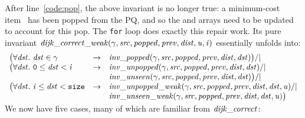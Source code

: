 After line~\ref{code:pop},
the above invariant is no longer true: a minimum-cost item~ has been
popped from the PQ, and so the  and  arrays need to be
updated to account for this pop. The \texttt{for} loop does exactly this repair work.
Its pure invariant
$\mathit{dijk\_correct\_weak}(\gamma, \mathit{src}, \mathit{popped}, \mathit{prev}, \mathit{dist}, \mathit{u}, \mathit{i})$ essentially unfolds into:
\vspace*{-0.25em}
\[
\begin{array}{lcl}
\big(\forall \m{dst}.~\m{dst} \in \gamma & -> & \m{inv\_popped}(\gamma, \m{src}, \m{popped}, \m{prev}, \m{dist}, \m{dst})\big) /| \null \\
\big(\forall \m{dst}.~\texttt{0} \le \m{dst} < \m{i} & -> & \m{inv\_unpopped}(\gamma, \m{src}, \m{popped}, \m{prev}, \m{dist}, \m{dst}) /| \null \\
&& \m{inv\_unseen}(\gamma, \m{src}, \m{popped}, \m{prev}, \m{dist}, \m{dst}) \big) /| \null \\
\big(\forall \m{dst}.~\m{i} \le \m{dst} < \texttt{size} & -> & \m{inv\_unpopped\_weak}(\gamma, \m{src}, \m{popped}, \m{prev}, \m{dist}, \m{dst}, \m{u}) /| \null \\
&&\m{inv\_unseen\_weak}(\gamma, \m{src}, \m{popped}, \m{prev}, \m{dist}, \m{dst}, \m{u}) \big) \\
[-0.5em]
\end{array}
\]
We now have five cases, many of which are familiar from $\mathit{dijk\_correct}$:
\vspace*{-0.25em}
